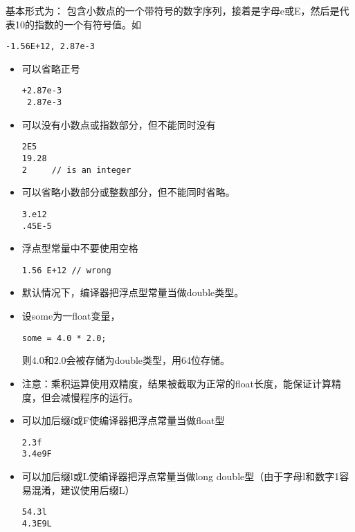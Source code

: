 \begin{frame}[fragile]
基本形式为：
包含小数点的一个带符号的数字序列，接着是字母e或E，然后是代表10的指数的一个有符号值。如
\begin{lstlisting}
-1.56E+12, 2.87e-3
\end{lstlisting}
\end{frame}
%
\begin{frame}[fragile]
\begin{itemize}
\item 可以省略正号
\begin{lstlisting}
+2.87e-3
 2.87e-3
\end{lstlisting}
\item 可以没有小数点或指数部分，但不能同时没有
\begin{lstlisting}
2E5
19.28
2     // is an integer
\end{lstlisting}
\item 可以省略小数部分或整数部分，但不能同时省略。
\begin{lstlisting}
3.e12
.45E-5
\end{lstlisting}
\end{itemize}
\end{frame}
%
\begin{frame}[fragile]
\begin{itemize}
\item 浮点型常量中不要使用空格
\begin{lstlisting}
1.56 E+12 // wrong
\end{lstlisting}
\item 默认情况下，编译器把浮点型常量当做double类型。\\[0.1in]
\item[] 设some为一float变量，
\begin{lstlisting}
some = 4.0 * 2.0;
\end{lstlisting}
则4.0和2.0会被存储为double类型，用64位存储。
\\[0.1in]
\item[] 注意：乘积运算使用双精度，结果被截取为正常的float长度，能保证计算精度，但会减慢程序的运行。
\end{itemize}
\end{frame}
%
\begin{frame}[fragile]
\begin{itemize}
\item 可以加后缀f或F使编译器把浮点常量当做float型
\begin{lstlisting}
2.3f
3.4e9F
\end{lstlisting}
\item 可以加后缀l或L使编译器把浮点常量当做long double型（由于字母l和数字1容易混淆，建议使用后缀L）
\begin{lstlisting}
54.3l
4.3E9L
\end{lstlisting}
\end{itemize}
\end{frame}

